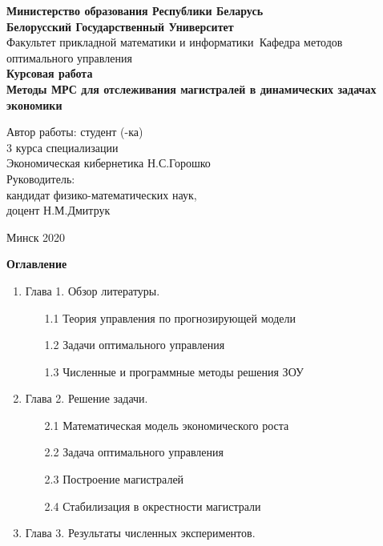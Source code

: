 \documentclass[12pt]{article}
\begin{document}
\begin{center}
\Large{\textbf{Министерство образования Республики Беларусь}}\\
\Large{\textbf{Белорусский Государственный Университет}}\\
\hfill \break
\hfill \break
\large{Факультет прикладной математики и информатики}\
\large{Кафедра методов оптимального управления}\\
\hfill \break
\hfill \break
\hfill \break
\hfill \break
\LARGE{\textbf{Курсовая работа}}\\
\large{\textbf{Методы МРС для отслеживания магистралей в динамических задачах экономики
}}\\
\hfill \break
\hfill \break
\hfill \break
\hfill \break
\hfill \break
\hfill \break
\hfill \break
\end{center}
\begin{flushleft}
	\normalsize{Автор работы: студент (-ка)}\\
	\normalsize{3 курса специализации}\\
	\normalsize{Экономическая кибернетика \underline{\hspace{5cm}}  Н.С.Горошко}\\
	\hfill \break
	\normalsize{Руководитель:}\\
	\normalsize{кандидат физико-математических наук,}\\
	\normalsize{доцент \hspace{4cm} \underline{\hspace{5cm}}   Н.М.Дмитрук}\\
\end{flushleft}
\begin{center}
	\hfill \break
	\hfill \break
	\hfill \break
	\hfill \break
	\hfill \break
	\hfill \break
	\hfill \break
	\hfill \break
	\hfill \break
	\hfill \break
	
	\normalsize{Минск 2020}
\end{center}
\newpage
\Large{\textbf{Оглавление}}
\begin{enumerate}
	\item Глава 1. Обзор литературы.
	\begin{enumerate}
		\item [1.1] Теория управления по прогнозирующей модели
		\item [1.2] Задачи оптимального управления
		\item [1.3] Численные и программные методы решения ЗОУ
	\end{enumerate}
\item Глава 2. Решение задачи.
\begin{enumerate}
	\item [2.1] Математическая модель экономического роста
	\item [2.2] Задача оптимального управления
	\item [2.3] Построение магистралей
	\item [2.4] Стабилизация в окрестности магистрали
\end{enumerate}
\item Глава 3. Результаты численных экспериментов.
\end{enumerate}
\newpage
\end{document}
